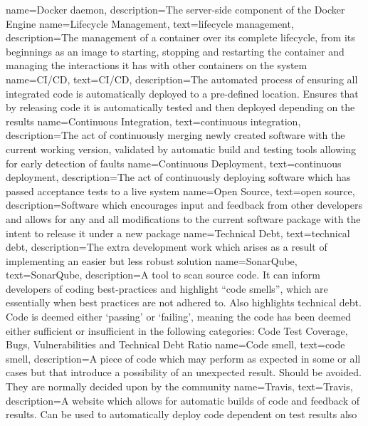 {
		name={Docker daemon},
		description={The server-side component of the Docker Engine}
}
{
		name={Lifecycle Management},
    text={lifecycle management},
		description={The management of a container over its complete lifecycle, from its beginnings as an image to starting, stopping and restarting the container and managing the interactions it has with other containers on the system}
}
{
		name={CI/CD},
    text={CI/CD},
		description={The automated process of ensuring all integrated code is automatically deployed to a pre-defined location. Ensures that by releasing code it is automatically tested and then deployed depending on the results}
}
{
		name={Continuous Integration},
    text={continuous integration},
		description={The act of continuously merging newly created software with the current working version, validated by automatic build and testing tools allowing for early detection of faults}
}
{
		name={Continuous Deployment},
		text={continuous deployment},
		description={The act of continuously deploying software which has passed acceptance tests to a live system}
}
{
    name={Open Source},
    text={open source},
    description={Software which encourages input and feedback from other developers and allows for any and all modifications to the current software package with the intent to release it under a new package}
}
{
    name={Technical Debt},
    text={technical debt},
    description={The extra development work which arises as a result of implementing an easier but less robust solution}
}
{
    name={SonarQube},
    text={SonarQube},
    description={A tool to scan source code. It can inform developers of coding best-practices and highlight ``code smells'', which are essentially when best practices are not adhered to. Also highlights technical debt. Code is deemed either `passing' or `failing', meaning the code has been deemed either sufficient or insufficient in the following categories: Code Test Coverage, Bugs, Vulnerabilities and Technical Debt Ratio}
}
{
    name={Code smell},
    text={code smell},
    description={A piece of code which may perform as expected in some or all cases but that introduce a possibility of an unexpected result. Should be avoided. They are normally decided upon by the community}
}
{
    name={Travis},
    text={Travis},
    description={A website which allows for automatic builds of code and feedback of results. Can be used to automatically deploy code dependent on test results also}
}
